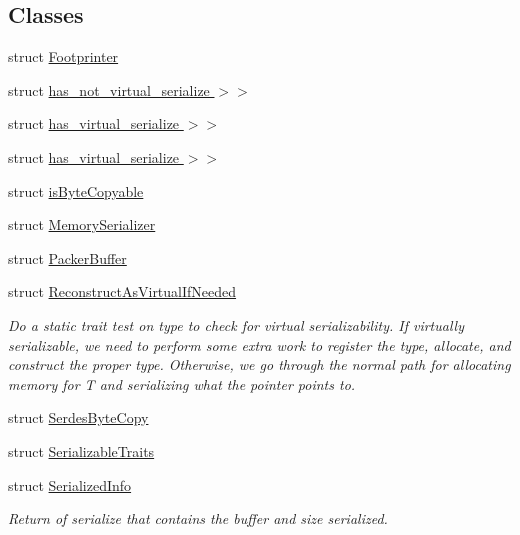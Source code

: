 \subsection*{Classes}
\begin{DoxyCompactItemize}
\item 
struct \hyperlink{structcheckpoint_1_1_footprinter}{Footprinter}
\item 
struct \hyperlink{structcheckpoint_1_1_serialize_virtual_type_if_needed_3_01_t_00_01_serializer_t_00_01typename_01169395079d468e6ff618832a51e34843}{has\+\_\+not\+\_\+virtual\+\_\+serialize $>$$>$}
\item 
struct \hyperlink{structcheckpoint_1_1_reconstruct_as_virtual_if_needed_3_01_t_00_01_serializer_t_00_01typename_01ab92c606a95e76aaa723ec61628f6529}{has\+\_\+virtual\+\_\+serialize $>$$>$}
\item 
struct \hyperlink{structcheckpoint_1_1_serialize_virtual_type_if_needed_3_01_t_00_01_serializer_t_00_01typename_019c8f7fc8348eb3352805b18f8a3adb0b}{has\+\_\+virtual\+\_\+serialize $>$$>$}
\item 
struct \hyperlink{structcheckpoint_1_1is_byte_copyable}{is\+Byte\+Copyable}
\item 
struct \hyperlink{structcheckpoint_1_1_memory_serializer}{Memory\+Serializer}
\item 
struct \hyperlink{structcheckpoint_1_1_packer_buffer}{Packer\+Buffer}
\item 
struct \hyperlink{structcheckpoint_1_1_reconstruct_as_virtual_if_needed}{Reconstruct\+As\+Virtual\+If\+Needed}
\begin{DoxyCompactList}\small\item\em Do a static trait test on type to check for virtual serializability. If virtually serializable, we need to perform some extra work to register the type, allocate, and construct the proper type. Otherwise, we go through the normal path for allocating memory for T and serializing what the pointer points to. \end{DoxyCompactList}\item 
struct \hyperlink{structcheckpoint_1_1_serdes_byte_copy}{Serdes\+Byte\+Copy}
\item 
struct \hyperlink{structcheckpoint_1_1_serializable_traits}{Serializable\+Traits}
\item 
struct \hyperlink{structcheckpoint_1_1_serialized_info}{Serialized\+Info}
\begin{DoxyCompactList}\small\item\em Return of serialize that contains the buffer and size serialized. \end{DoxyCompactList}\item 

\end{DoxyCompactItemize}
